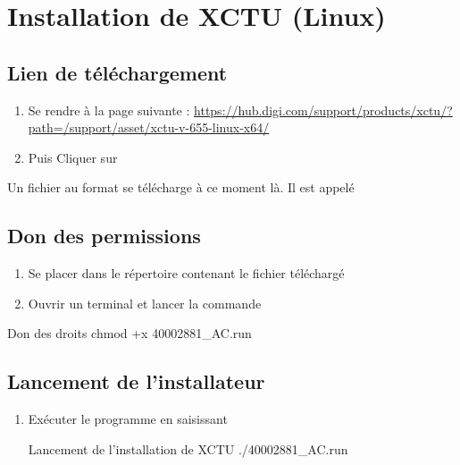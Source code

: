 {\section{Installation de XCTU (Linux)}
\subsection{Lien de téléchargement}

\begin{enumerate}
 \item Se rendre à la page suivante : 
\url{https://hub.digi.com/support/products/xctu/?path=/support/asset/xctu-v-655-linux-x64/}

\item Puis Cliquer sur 
\end{enumerate}



Un fichier au format  se télécharge à ce moment là. Il est appelé 

\subsection{Don des permissions}

\begin{enumerate}
    \item Se placer dans le répertoire contenant le fichier téléchargé \\
    \item Ouvrir un terminal et lancer la commande \\
\end{enumerate}

\begin{Bash}{Don des droits}
chmod +x 40002881_AC.run
\end{Bash}
\subsection{Lancement de l'installateur}

\begin{enumerate}

    \item Exécuter le programme en saisissant 
    
\begin{Bash}{Lancement de l'installation de XCTU}
./40002881_AC.run
\end{Bash}


\end{enumerate}}

